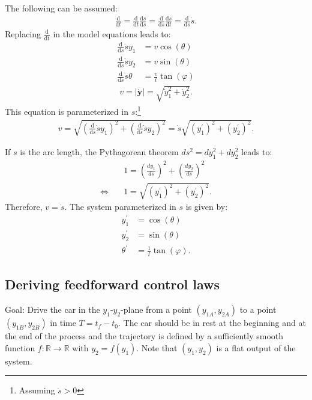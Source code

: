 \documentclass[a4paper,12pt,headinclude=true,headsepline,parskip=half,DIV=12]{scrartcl}
\renewcommand{\d}{\mathrm{d}} %
\newcommand{\yIZ}{y_{1A}}
\newcommand{\yIIZ}{y_{2A}}
\newcommand{\yIT}{y_{1B}}
\newcommand{\yIIT}{y_{2B}}
\begin{document}
The following can be assumed:
\begin{align*}
  \frac{\d}{\d t} = \frac{\d}{\d t}\frac{\d s}{\d s} = \frac{\d}{\d s}\frac{\d s}{\d t} = \frac{\d}{\d s}\dot s.
\end{align*}
Replacing $\frac{\d}{\d t}$ in the model equations leads to:
\begin{subequations}
  \begin{align}
    \frac{\d}{\d s}\dot s y_1    & = v \cos(\theta)            \\
    \frac{\d}{\d s}\dot s y_2    & = v \sin(\theta)            \\
    \frac{\d}{\d s}\dot s \theta & = \frac{v}{l}\tan(\varphi)
  \end{align}
\end{subequations}
\begin{align}
  v = |\dot{\bm{y}}| = \sqrt{\dot y_1^2+\dot y_2^2}.
\end{align}
This equation is parameterized in $s$:\footnote{Assuming $\dot s > 0$}
\begin{align}
  v = \sqrt{(\frac{\d}{\d s}\dot sy_1)^2+(\frac{\d}{\d s}\dot s y_2)^2}=\dot s \sqrt{(y_1^\prime)^2+(y_2^\prime)^2}.
\end{align}

If $s$ is the arc length, the Pythagorean theorem $ds^2 = dy_1^2 + dy_2^2$ leads to:
\begin{subequations}
  \begin{align}
    & 1 = \left(\frac{dy_1}{ds}\right)^2 + \left(\frac{dy_2}{ds}\right)^2 \\
    \Leftrightarrow \quad & 1 = \sqrt{(y_1^\prime)^2+(y_2^\prime)^2}.
  \end{align}
\end{subequations}
Therefore, $v=\dot s$.
The system parameterized in $s$ is given by:
\begin{subequations}
  \begin{align}
    y_1^\prime    & = \cos(\theta)              \\
    y_2^\prime    & = \sin(\theta)              \\
    \theta^\prime & = \frac{1}{l}\tan(\varphi).
  \end{align}
\end{subequations}



\subsection{Deriving feedforward control laws}
Goal: Drive the car in the $y_1$-$y_2$-plane from a point $(\yIZ, \yIIZ)$ to a point $(\yIT, \yIIT)$ in time $T=t_f-t_0$. The car should be in rest at the beginning and at the end of the process and the trajectory is defined by a sufficiently smooth function $f : \mathbb{R} \to \mathbb{R}$ with $y_2 = f(y_1)$. Note that $(y_1, y_2)$ is a flat output of the system.
\end{document}
